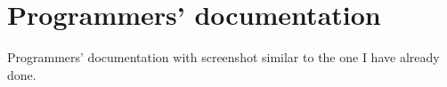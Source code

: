 \chapter{Programmers' documentation}
Programmers' documentation with screenshot similar to the one I have already done.